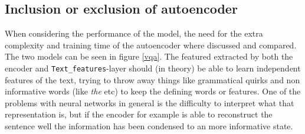 \documentclass[10pt,a4paper]{report}
\begin{document}
	\subsection*{Inclusion or exclusion of autoencoder}
	When considering the performance of the model, the need for the extra complexity and training time of the autoencoder where discussed and compared. The two models can be seen in figure \ref{vqa}. The featured extracted by both the encoder and \texttt{Text\_features}-layer should (in theory) be able to learn independent features of the text, trying to throw away things like grammatical quirks and non informative words (like \textit{the} etc) to keep the defining words or features. One of the problems with neural networks in general is the difficulty to interpret what that representation is, but if the encoder for example is able to reconstruct the sentence well the information has been condensed to an more informative state.
\end{document}
